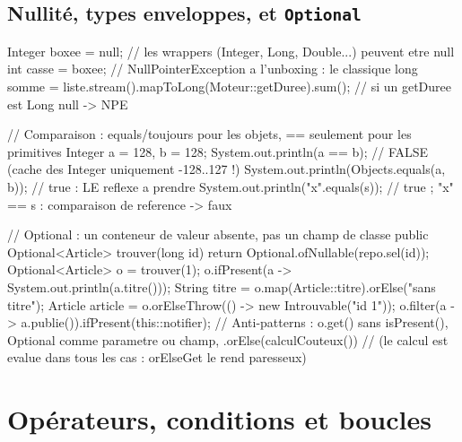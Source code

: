 \documentclass[12pt,a4paper,twoside,openright]{book}
\begin{document}
\subsection{Nullit\'e, types enveloppes, et \texttt{Optional}}

\begin{codejava}
Integer boxee = null;                  // les wrappers (Integer, Long, Double...) peuvent etre null
int casse = boxee;                      // NullPointerException a l'unboxing : le classique
long somme = liste.stream().mapToLong(Moteur::getDuree).sum();  // si un getDuree est Long null -> NPE

// Comparaison : equals/toujours pour les objets, == seulement pour les primitives
Integer a = 128, b = 128;
System.out.println(a == b);             // FALSE  (cache des Integer uniquement -128..127 !)
System.out.println(Objects.equals(a, b));   // true : LE reflexe a prendre
System.out.println("x".equals(s));         // true ; "x" == s : comparaison de reference -> faux

// Optional : un conteneur de valeur absente, pas un champ de classe
public Optional<Article> trouver(long id) {
    return Optional.ofNullable(repo.sel(id));
}
Optional<Article> o = trouver(1);
o.ifPresent(a -> System.out.println(a.titre()));
String titre = o.map(Article::titre).orElse("sans titre");
Article article = o.orElseThrow(() -> new Introuvable("id 1"));
o.filter(a -> a.publie()).ifPresent(this::notifier);
// Anti-patterns : o.get() sans isPresent(), Optional comme parametre ou champ, .orElse(calculCouteux())
// (le calcul est evalue dans tous les cas : orElseGet le rend paresseux)
\end{codejava}

\section{Op\'erateurs, conditions et boucles}
\end{document}
